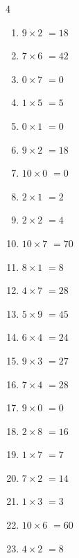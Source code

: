 \begin{multicols}{4}
\begin{enumerate}
\columnbreak %

  \item $9\times 2$
        $=18$

  \item $7\times 6$
        $=42$

  \item $0\times 7$
        $=0$

  \item $1\times 5$
        $=5$

  \item $0\times 1$
        $=0$

  \item $9\times 2$
        $=18$

  \item $10\times 0$
        $=0$

  \item $2\times 1$
        $=2$

  \item $2\times 2$
        $=4$

  \item $10\times 7$
        $=70$

  \item $8\times 1$
        $=8$

  \item $4\times 7$
        $=28$

  \item $5\times 9$
        $=45$

  \item $6\times 4$
        $=24$

  \item $9\times 3$
        $=27$

  \item $7\times 4$
        $=28$

  \item $9\times 0$
        $=0$

  \item $2\times 8$
        $=16$

  \item $1\times 7$
        $=7$

  \item $7\times 2$
        $=14$

  \item $1\times 3$
        $=3$

  \item $10\times 6$
        $=60$

  \item $4\times 2$
        $=8$


\end{enumerate}
\end{multicols}
